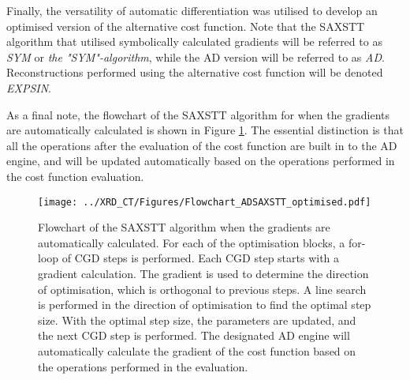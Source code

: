 Finally, the versatility of automatic differentiation was utilised to develop an optimised version of the alternative cost function.
Note that the SAXSTT algorithm that utilised symbolically calculated gradients will be referred to as \emph{SYM} or \emph{the "SYM"-algorithm},
while the AD version will be referred to as \emph{AD}. Reconstructions performed using the alternative cost function will be denoted \emph{EXPSIN}.




As a final note, the flowchart of the SAXSTT algorithm for when the gradients are automatically calculated is shown in Figure \ref{fig:flowchart_ADSAXSTT}.
The essential distinction is that all the operations after the evaluation of the cost function are built in to the AD engine, and will be updated automatically
based on the operations performed in the cost function evaluation.

\begin{figure}
    \centering
    \texttt{[image: ../XRD\_CT/Figures/Flowchart\_ADSAXSTT\_optimised.pdf]}
    \caption{Flowchart of the SAXSTT algorithm when the gradients are automatically calculated.
        For each of the optimisation blocks, a for-loop of CGD steps is performed.
        Each CGD step starts with a gradient calculation.
        The gradient is used to determine the direction of optimisation, which is orthogonal to previous steps.
        A line search is performed in the direction of optimisation to find the optimal step size.
        With the optimal step size, the parameters are updated, and the next CGD step is performed.
        The designated AD engine will automatically calculate the gradient of the cost function based on the operations performed in the evaluation.
    }
    \label{fig:flowchart_ADSAXSTT}
\end{figure}